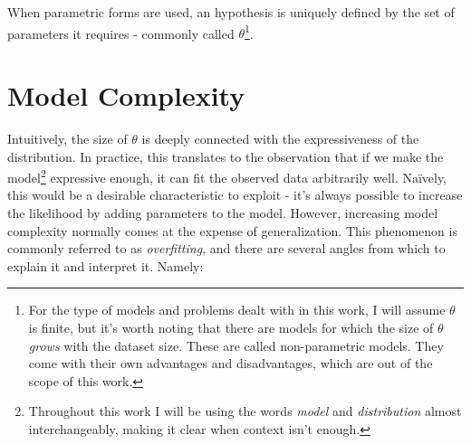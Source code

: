 When parametric forms are used, an hypothesis is uniquely defined by the set of
parameters it requires - commonly called $\theta$\footnote{For the type of models
and problems dealt with in this work, I will assume $\theta$ is finite, but it's
worth noting that there are models for which the size of $\theta$ \emph{grows}
with the dataset size. These are called non-parametric models. They come with
their own advantages and disadvantages, which are out of the scope of this work.}.

\section{Model Complexity}
\label{section:modelcomplexity}
Intuitively, the size of $\theta$ is deeply connected with the expressiveness
of the distribution. In practice, this translates to the observation that if we
make the model\footnote{Throughout this work I will be using the words \emph{model}
and \emph{distribution} almost interchangeably, making it clear when context isn't
enough.} expressive enough, it can fit the observed data arbitrarily well. Naïvely,
this would be a desirable characteristic to exploit - it's always possible to increase
the likelihood by adding parameters to the model. However, increasing model
complexity normally comes at the expense of generalization. This phenomenon is
commonly referred to as \emph{overfitting}, and there are several
angles from which to explain it and interpret it. Namely:
